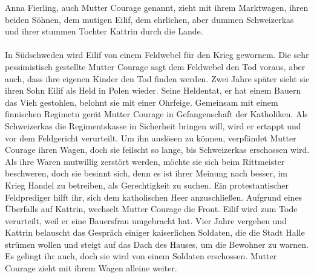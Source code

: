 \documentclass[a4paper]{article}
\begin{document}
	Anna Fierling, auch Mutter Courage genannt, zieht mit ihrem Marktwagen, ihren beiden Söhnen, dem mutigen Eilif, dem ehrlichen, aber dummen Schweizerkas und ihrer stummen Tochter Kattrin durch die Lande.\\\\
        In Südschweden wird Eilif von einem Feldwebel für den Krieg gewornem. Die sehr pessimistisch gestellte Mutter Courage sagt dem Feldwebel den Tod voraus, aber auch, dass ihre eigenen Kinder den Tod finden werden. Zwei Jahre später sieht sie ihren Sohn Eilif als Held in Polen wieder. Seine Heldentat, er hat einem Bauern das Vieh gestohlen, belohnt sie mit einer Ohrfeige. Gemeinsam mit einem finnischen Regimetn gerät Mutter Courage in Gefangenschaft der Katholiken. Als Schweizerkas die Regimentskasse in Sicherheit bringen will, wird er ertappt und vor dem Feldgericht verurteilt. Um ihn auslösen zu können, verpfändet Mutter Courage ihren Wagen, doch sie feilscht so lange, bis Schweizerkas erschossen wird. Als ihre Waren mutwillig zerstört werden, möchte sie sich beim Rittmeister beschweren, doch sie besinnt sich, denn es ist ihrer Meinung nach besser, im Krieg Handel zu betreiben, als Gerechtigkeit zu suchen. Ein protestantischer Feldprediger hilft ihr, sich dem katholischen Heer anzuschließen. Aufgrund eines Überfalls auf Kattrin, wechselt Mutter Courage die Front. Eilif wird zum Tode verurteilt, weil er eine Bauersfrau umgebracht hat. Vier Jahre vergehen und Kattrin belauscht das Gespräch einiger kaiserlichen Soldaten, die die Stadt Halle strümen wollen und steigt auf das Dach des Hauses, um die Bewohner zu warnen. Es gelingt ihr auch, doch sie wird von einem Soldaten erschossen. Mutter Courage zieht mit ihrem Wagen alleine weiter.
\end{document}
